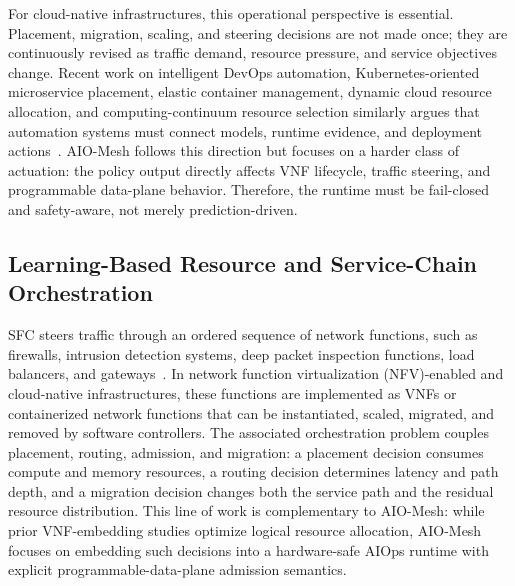 \documentclass[final,5p]{elsarticle}
\newcommand{\rev}[1]{\textcolor{revisiongreen}{#1}}
\begin{document}
For cloud-native infrastructures, this operational perspective is essential. Placement, migration, scaling, and steering decisions are not made once; they are continuously revised as traffic demand, resource pressure, and service objectives change. Recent work on intelligent DevOps automation, Kubernetes-oriented microservice placement, elastic container management, dynamic cloud resource allocation, and computing-continuum resource selection similarly argues that automation systems must connect models, runtime evidence, and deployment actions~\cite{eramo2024architecture,ding2023kubernetes,mao2023flowcon,chen2023workloadwindows,chen2024crossedge,sedghani2024space4aid}. AIO-Mesh follows this direction but focuses on a harder class of actuation: the policy output directly affects VNF lifecycle, traffic steering, and programmable data-plane behavior. Therefore, the runtime must be fail-closed and safety-aware, not merely prediction-driven.




\subsection{Learning-Based Resource and Service-Chain Orchestration}
\label{subsec:related_learning}

\rev{SFC} steers traffic through an ordered sequence of network functions, such as firewalls, intrusion detection systems, deep packet inspection functions, load balancers, and gateways~\cite{rfc7665}. In \rev{network function virtualization (NFV)}-enabled and cloud-native infrastructures, these functions are implemented as VNFs or containerized network functions that can be instantiated, scaled, migrated, and removed by software controllers. The associated orchestration problem couples placement, routing, admission, and migration: a placement decision consumes compute and memory resources, a routing decision determines latency and path depth, and a migration decision changes both the service path and the residual resource distribution. This line of work is complementary to AIO-Mesh: while prior VNF-embedding studies optimize logical resource allocation, AIO-Mesh focuses on embedding such decisions into a hardware-safe AIOps runtime with explicit programmable-data-plane admission semantics.
\end{document}
